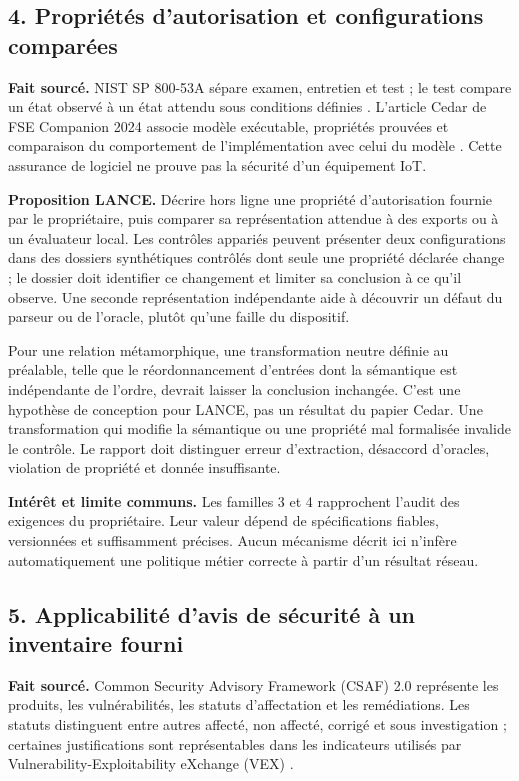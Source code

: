 \documentclass[11pt,a4paper]{article}
\begin{document}
\subsection*{4. Propriétés d'autorisation et configurations comparées}
\textbf{Fait sourcé.} NIST SP 800-53A sépare examen, entretien et test ; le test compare un état observé à un état attendu sous conditions définies \cite{nist53a}. L'article Cedar de FSE Companion 2024 associe modèle exécutable, propriétés prouvées et comparaison du comportement de l'implémentation avec celui du modèle \cite{cedar}. Cette assurance de logiciel ne prouve pas la sécurité d'un équipement IoT.

\textbf{Proposition LANCE.} Décrire hors ligne une propriété d'autorisation fournie par le propriétaire, puis comparer sa représentation attendue à des exports ou à un évaluateur local. Les contrôles appariés peuvent présenter deux configurations dans des dossiers synthétiques contrôlés dont seule une propriété déclarée change ; le dossier doit identifier ce changement et limiter sa conclusion à ce qu'il observe. Une seconde représentation indépendante aide à découvrir un défaut du parseur ou de l'oracle, plutôt qu'une faille du dispositif.

Pour une relation métamorphique, une transformation neutre définie au préalable, telle que le réordonnancement d'entrées dont la sémantique est indépendante de l'ordre, devrait laisser la conclusion inchangée. C'est une hypothèse de conception pour LANCE, pas un résultat du papier Cedar. Une transformation qui modifie la sémantique ou une propriété mal formalisée invalide le contrôle. Le rapport doit distinguer erreur d'extraction, désaccord d'oracles, violation de propriété et donnée insuffisante.

\textbf{Intérêt et limite communs.} Les familles 3 et 4 rapprochent l'audit des exigences du propriétaire. Leur valeur dépend de spécifications fiables, versionnées et suffisamment précises. Aucun mécanisme décrit ici n'infère automatiquement une politique métier correcte à partir d'un résultat réseau.

\newpage
\subsection*{5. Applicabilité d'avis de sécurité à un inventaire fourni}
\textbf{Fait sourcé.} Common Security Advisory Framework (CSAF) 2.0 représente les produits, les vulnérabilités, les statuts d'affectation et les remédiations. Les statuts distinguent entre autres affecté, non affecté, corrigé et sous investigation ; certaines justifications sont représentables dans les indicateurs utilisés par Vulnerability-Exploitability eXchange (VEX) \cite{csaf}.
\end{document}
